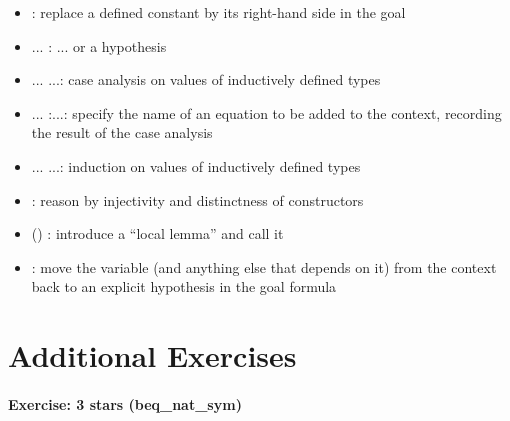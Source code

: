 \documentclass[12pt]{report}
\begin{document}
\begin{itemize}
\item  {}:
        replace a defined constant by its right-hand side in the goal 



\item  {}...  :
        ... or a hypothesis  



\item  {}... ...:
        case analysis on values of inductively defined types 



\item  {}... :...:
        specify the name of an equation to be added to the context,
        recording the result of the case analysis



\item  {}... ...:
        induction on values of inductively defined types 



\item  {}:
        reason by injectivity and distinctness of constructors



\item  {} ()  :
        introduce a ``local lemma''  and call it  



\item  {}  :
        move the variable  (and anything else that depends on it)
        from the context back to an explicit hypothesis in the goal
        formula 

\end{itemize}
\begin{coqdoccode}
\coqdocemptyline
\end{coqdoccode}
\section{Additional Exercises}



\paragraph{Exercise: 3 stars (beq\_nat\_sym)}
\end{document}
